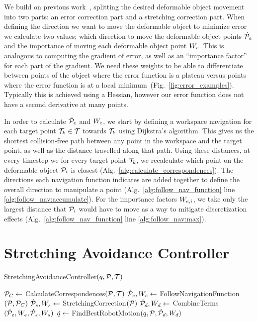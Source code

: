 We build on previous work~\cite{Berenson2013}, splitting the desired deformable object movement into two parts: an error correction part and a stretching correction part. When defining the direction we want to move the deformable object to minimize error we calculate two values; which direction to move the deformable object points $\dot{\mathcal{P}}_e$ and the importance of moving each deformable object point $W_e$. This is analogous to computing the gradient of error, as well as an ``importance factor'' for each part of the gradient. We need these weights to be able to differentiate between points of the object where the error function is a plateau versus points where the error function is at a local minimum~(Fig.~\ref{fig:error_examples}). Typically this is achieved using a Hessian, however our error function does not have a second derivative at many points. 

In order to calculate $\dot{\mathcal{P}}_e$ and $W_e$, we start by defining a workspace navigation for each target point $\mathcal{T}_k \in \mathcal{T}$ towards $\mathcal{T}_k$ using Dijkstra's algorithm. This gives us the shortest collision-free path between any point in the workspace and the target point, as well as the distance travelled along that path. Using these distances, at every timestep we for every target point $\mathcal{T}_k$, we recalculate which point on the deformable object $\mathcal{P}_i$ is closest (Alg.~\ref{alg:calculate_correspondences}). The directions each navigation function indicates are added together to define the overall direction to manipulate a point (Alg.~\ref{alg:follow_nav_function} line \ref{alg:follow_nav:accumulate}). For the importance factors $W_{e,i}$, we take only the largest distance that $\mathcal{P}_i$ would have to move as a way to mitigate discretization effects (Alg.~\ref{alg:follow_nav_function} line \ref{alg:follow_nav:max}).


\section{Stretching Avoidance Controller}
\label{sec:stretching_avoidance_controller}

\begin{algorithm}[ht]
    \caption{StretchingAvoidanceController$(q, \mathcal{P}, \mathcal{T})$}
    \begin{algorithmic}[1]
        \State $\mathcal{P}_C \gets$ CalculateCorrespondences$(\mathcal{P}, \mathcal{T})$
        \State $\dot{\mathcal{P}}_e, W_e \gets$ FollowNavigationFunction$(\mathcal{P}, \mathcal{P}_C)$
        \State $\dot{\mathcal{P}}_s, W_s \gets$ StretchingCorrection$(\mathcal{P})$
        \State $\dot{\mathcal{P}}_d, W_d \gets$ CombineTerms$(\dot{\mathcal{P}}_e, W_e, \dot{\mathcal{P}}_s, W_s)$
        \State $\dot{q} \gets$ FindBestRobotMotion$(q, \mathcal{P}, \dot{\mathcal{P}}_d, W_d)$
    \end{algorithmic}
    \label{alg:stretching_avoidance_controller}
\end{algorithm}

